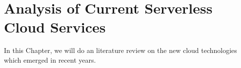\chapter{Analysis of Current Serverless Cloud Services}
In this Chapter, we will do an literature review on the new cloud technologies which emerged in recent years. 